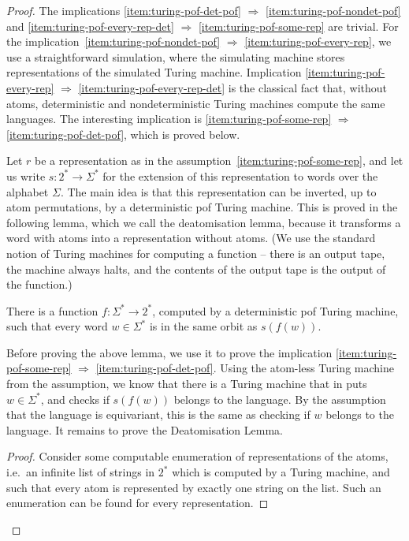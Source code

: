 \begin{proof}
    The implications \ref{item:turing-pof-det-pof} $\Rightarrow$ \ref{item:turing-pof-nondet-pof} and \ref{item:turing-pof-every-rep-det} $\Rightarrow$ \ref{item:turing-pof-some-rep} are trivial. 
    For the implication~\ref{item:turing-pof-nondet-pof} $\Rightarrow$ \ref{item:turing-pof-every-rep}, we use a straightforward simulation, where the simulating machine stores representations of the simulated Turing machine.
    Implication \ref{item:turing-pof-every-rep} $\Rightarrow$ \ref{item:turing-pof-every-rep-det} is the classical fact that, without atoms, deterministic and nondeterministic Turing machines compute the same languages. The interesting implication is \ref{item:turing-pof-some-rep} $\Rightarrow$ \ref{item:turing-pof-det-pof}, which is proved below.
    
    Let $r$ be a representation as in the assumption~\ref{item:turing-pof-some-rep}, and let us write $s : 2^* \to \Sigma^*$ for the extension of this representation to words over the alphabet $\Sigma$. The main idea is that this representation can be inverted, up to atom permutations, by a deterministic pof Turing machine. This is proved in the following lemma, which we call the deatomisation lemma, because it transforms a word with atoms into a representation without atoms.   (We use the standard notion of Turing machines for computing a function -- there is an output tape, the machine always halts, and the contents of the output tape is the output of the function.)

    \begin{lemma}[Deatomisation]\label{lem:deatomisation}
        There is a function $f: \Sigma^* \to 2^*$, 
         computed by a deterministic pof Turing machine,  such that  every word $w \in \Sigma^*$ is in the same orbit as $s(f(w))$.
    \end{lemma}

    Before proving the above lemma, we use it to prove the implication \ref{item:turing-pof-some-rep} $\Rightarrow$ \ref{item:turing-pof-det-pof}. Using the atom-less Turing machine from the  assumption, we know that there is a Turing machine that  in puts $w \in \Sigma^*$, and checks if  $s(f(w))$ belongs to the language. By the assumption that the language is equivariant, this is the same as checking if $w$ belongs to the language. It remains to prove the Deatomisation Lemma.

    \begin{proof}
        Consider some computable enumeration of representations of the atoms, i.e.~an infinite list of strings in $2^*$ 
        which is computed by a Turing machine, and such that every atom is represented by exactly one string on the list. Such an enumeration can be found for every representation. 


\end{proof}
\end{proof}
